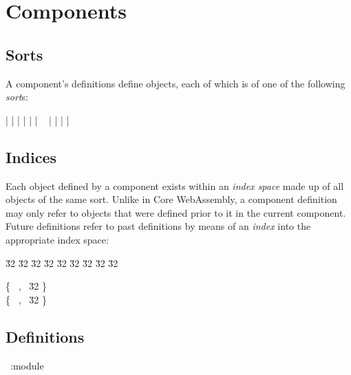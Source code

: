 \section{Components}

\subsection{Sorts}

A component's definitions define objects, each of which is of one of
the following \emph{sort}s:

\begin{sum-productions}
    \CSFUNC | \CSTABLE | \CSMEMORY | \CSGLOBAL | \CSTYPE | \CSMODULE |
    \CSINSTANCE
    \SCORE~\coresort \alt
    \SFUNC | \SVALUE | \STYPE | \SCOMPONENT | \SINSTANCE
\end{sum-productions}

\subsection{Indices}

Each object defined by a component exists within an \emph{index space}
made up of all objects of the same sort. Unlike in Core WebAssembly, a
component definition may only refer to objects that were defined prior
to it in the current component. Future definitions refer to past
definitions by means of an \emph{index} into the appropriate index
space:

\begin{record-productions}
   \u32
   \u32
   \u32
   \u32
   \u32
   \u32
   \u32
   \u32
   \u32
\end{record-productions}

\begin{record-productions}
   \{ \CSISORT~\coresort, \CSIIDX~\u32 \}\\
   \{ \SISORT~\sort, \SIIDX~\u32 \}
\end{record-productions}

\subsection{Definitions}

\begin{sum-productions}
    \DCOREMODULE~\core:module \alt
    \DCOREINSTANCE~\coreinstance \alt
    \DCORETYPE~\coredeftype \alt
    \DCOMPONENT~\component \alt
    \DINSTANCE~\instance \alt
    \DALIAS~\alias \alt
    \DTYPE~ \alt
    \DCANON~\canon \alt
    \DSTART~\start \alt
    \DIMPORT~ \alt
    \DEXPORT~\export
\end{sum-productions}

